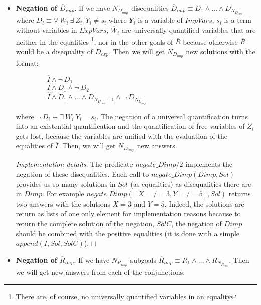 \documentclass{tlp}
\begin{document}
\begin{itemize}
           \item {\bf Negation of $\overline{D}_{imp}$}. If we have
           $N_{D_{imp}}$ disequalities $\overline{D}_{imp} \equiv D_1
           \wedge \ldots \wedge D_{N_{D_{imp}}}$ where $ D_i \equiv
           \forall~ \overline{W}_i ~ \exists~ \overline{Z}_i ~~  Y_i
           \neq s_i$ where $Y_i$ is a variable of $ImpVars$, $s_i$ is
           a term without variables in $ExpVars$, $\overline{W}_i$ are
           universally quantified variables that are neither in the
           equalities \footnote{There are, of course, no universally
           quantified variables in an equality}, nor in the other
           goals of $\overline{R}$ because otherwise $\overline{R}$
           would be a disequality of $\overline{D}_{exp}$. Then we
           will get $N_{D_{imp}}$ new solutions with the format: 

           $~~~~~~~~~~~~~~~~~~~~\overline{I} \wedge \neg~ D_1 $ \\ 
           $~~~~~~~~~~~~~~~~~~~~\overline{I} \wedge
           D_1 \wedge \neg~ D_2 $ \\ 
           $~~~~~~~~~~~~~~~~~~~~\ldots $ \\ 
           $~~~~~~~~~~~~~~~~~~~~\overline{I} \wedge
           D_1 \wedge \ldots \wedge D_{N_{D_{imp}}-1} \wedge \neg~
           D_{N_{D_{imp}}}$ 

           where $ \neg~ D_i \equiv \exists~
           \overline{W}_i~ Y_i = s_i$. The negation of a universal
           quantification turns into an existential quantification and
           the quantification of free variables of $\overline{Z}_i$
           gets lost, because the variables are unified with the evaluation of
           the equalities of $\overline{I}$. Then, we will get
           $N_{D_{imp}}$ new answers.

\noindent
\emph{Implementation details}: The predicate $negate\_Dimp/2$ implements the
negation of these disequalities. Each call to $negate\_Dimp(Dimp,Sol)$
provides us so many solutions in $Sol$ (as equalities) as disequalities there
are in $Dimp$. For example $negate\_Dimp([X=/=3,Y=/=5],Sol)$ returns two
answers with the solutions $X=3$ and $Y=5$. Indeed, the solutions are return
as lists of one only element for implementation reasons because to return the
complete solution of the negation, $SolC$, the negation of $Dimp$ should be
combined with the positive equalities (it is done with a simple
$append(I,Sol,SolC)$).$\Box$

           \item {\bf Negation of $\overline{R}_{imp}$}. If we have
           $N_{R_{imp}}$ subgoals $\overline{R}_{imp} \equiv R_1 \wedge \ldots
           \wedge R_{N_{R_{imp}}}$. Then we will get new answers from each of
           the conjunctions:


\end{itemize}
\end{document}
